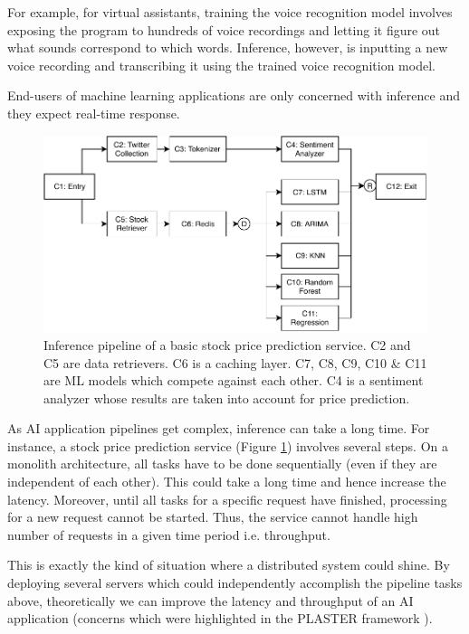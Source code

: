 \documentclass{report}
\begin{document}
For example, for virtual assistants, training the voice recognition model involves exposing the program to hundreds of voice recordings and letting it figure out what sounds correspond to which words. Inference, however, is inputting a new voice recording and transcribing it using the trained voice recognition model.

End-users of machine learning applications are only concerned with inference and they expect real-time response.

\begin{figure}
  \centering
  \includegraphics[width=\textwidth]{StockPriceServiceBasic.pdf}
  \caption{Inference pipeline of a basic stock price prediction service. C2 and C5 are data retrievers. C6 is a caching layer. C7, C8, C9, C10 \& C11 are ML models which compete against each other. C4 is a sentiment analyzer whose results are taken into account for price prediction.}
  \label{fig:StockPriceServiceBasic}
\end{figure}

As AI application pipelines get complex, inference can take a long time. For instance, a stock price prediction service (Figure \ref{fig:StockPriceServiceBasic}) involves several steps. On a monolith architecture, all tasks have to be done sequentially (even if they are independent of each other). This could take a long time and hence increase the latency. Moreover, until all tasks for a specific request have finished, processing for a new request cannot be started. Thus, the service cannot handle high number of requests in a given time period i.e. throughput.

This is exactly the kind of situation where a distributed system could shine. By deploying several servers which could independently accomplish the pipeline tasks above, theoretically we can improve the latency and throughput of an AI application (concerns which were highlighted in the PLASTER framework \cite{Teich2018}).
\end{document}
